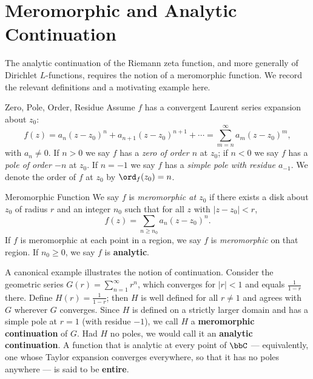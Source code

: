 
\section{Meromorphic and Analytic Continuation}\label{sec:meromorphic-analytic}

The analytic continuation of the Riemann zeta function, and more generally of Dirichlet $L$-functions, requires the notion of a meromorphic function. We record the relevant definitions and a motivating example here.

\begin{Definition}{Zero, Pole, Order, Residue}{}
  Assume $f$ has a convergent Laurent series expansion about $z_0$:
  $$f(z) = a_n(z-z_0)^n + a_{n+1}(z-z_0)^{n+1} + \cdots = \sum_{m=n}^{\infty} a_m(z-z_0)^m,$$
  with $a_n \neq 0$. If $n > 0$ we say $f$ has a \emph{zero of order $n$} at $z_0$; if $n < 0$ we say $f$ has a \emph{pole of order $-n$} at $z_0$. If $n = -1$ we say $f$ has a \emph{simple pole with residue $a_{-1}$}. We denote the order of $f$ at $z_0$ by $\ord_f(z_0) = n$.
\end{Definition}

\begin{Definition}{Meromorphic Function}{}
  We say $f$ is \emph{meromorphic at $z_0$} if there exists a disk about $z_0$ of radius $r$ and an integer $n_0$ such that for all $z$ with $|z - z_0| < r$,
  $$f(z) = \sum_{n \geq n_0} a_n(z-z_0)^n.$$
  If $f$ is meromorphic at each point in a region, we say $f$ is \emph{meromorphic} on that region. If $n_0 \geq 0$, we say $f$ is \textbf{analytic}.
\end{Definition}

A canonical example illustrates the notion of continuation. Consider the geometric series $G(r) = \sum_{n=1}^{\infty} r^n$, which converges for $|r| < 1$ and equals $\frac{1}{1-r}$ there. Define $H(r) = \frac{1}{1-r}$; then $H$ is well defined for all $r \neq 1$ and agrees with $G$ wherever $G$ converges. Since $H$ is defined on a strictly larger domain and has a simple pole at $r = 1$ (with residue $-1$), we call $H$ a \textbf{meromorphic continuation} of $G$. Had $H$ no poles, we would call it an \textbf{analytic continuation}. A function that is analytic at every point of $\bbC$ --- equivalently, one whose Taylor expansion converges everywhere, so that it has no poles anywhere --- is said to be \textbf{entire}.

